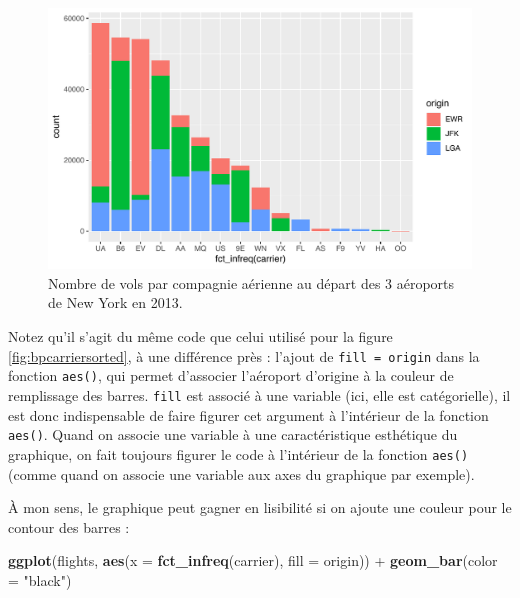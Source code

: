 \documentclass[a4paperpaper,]{article}
\newenvironment{Shaded}{\begin{snugshade}}{\end{snugshade}}
\newcommand{\DataTypeTok}[1]{\textcolor[rgb]{0.00,0.34,0.68}{#1}}
\newcommand{\KeywordTok}[1]{\textcolor[rgb]{0.12,0.11,0.11}{\textbf{#1}}}
\newcommand{\NormalTok}[1]{\textcolor[rgb]{0.12,0.11,0.11}{#1}}
\newcommand{\OperatorTok}[1]{\textcolor[rgb]{0.12,0.11,0.11}{#1}}
\newcommand{\StringTok}[1]{\textcolor[rgb]{0.75,0.01,0.01}{#1}}
\theoremstyle{definition}
\theoremstyle{definition}
\theoremstyle{definition}
\theoremstyle{remark}
\begin{document}
\begin{figure}[htpb]

{\centering \includegraphics[width=0.9\linewidth]{figure/stacked-1} 

}

\caption{Nombre de vols par compagnie aérienne au départ des 3 aéroports de New York en 2013.}\label{fig:stacked}
\end{figure}

Notez qu'il s'agit du même code que celui utilisé pour la figure
\ref{fig:bpcarriersorted}, à une différence près : l'ajout de
\texttt{fill\ =\ origin} dans la fonction \texttt{aes()}, qui permet
d'associer l'aéroport d'origine à la couleur de remplissage des barres.
\texttt{fill} est associé à une variable (ici, elle est catégorielle),
il est donc indispensable de faire figurer cet argument à l'intérieur de
la fonction \texttt{aes()}. Quand on associe une variable à une
caractéristique esthétique du graphique, on fait toujours figurer le
code à l'intérieur de la fonction \texttt{aes()} (comme quand on associe
une variable aux axes du graphique par exemple).

À mon sens, le graphique peut gagner en lisibilité si on ajoute une
couleur pour le contour des barres :

\begin{Shaded}
\begin{Highlighting}[]
\KeywordTok{ggplot}\NormalTok{(flights, }\KeywordTok{aes}\NormalTok{(}\DataTypeTok{x =} \KeywordTok{fct_infreq}\NormalTok{(carrier), }\DataTypeTok{fill =}\NormalTok{ origin)) }\OperatorTok{+}
\StringTok{  }\KeywordTok{geom_bar}\NormalTok{(}\DataTypeTok{color =} \StringTok{"black"}\NormalTok{)}
\end{Highlighting}
\end{Shaded}
\end{document}
